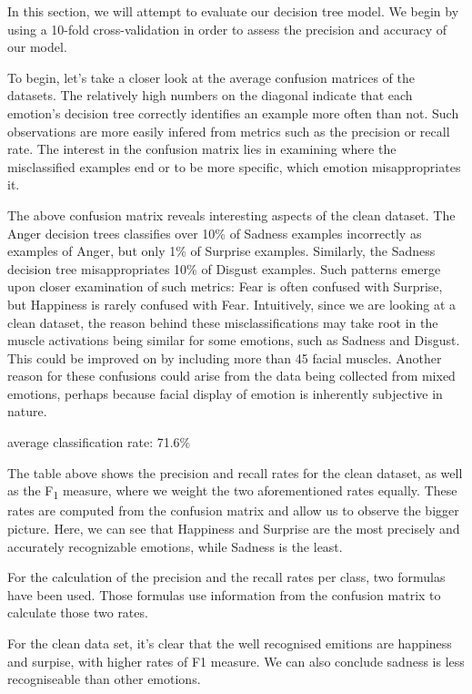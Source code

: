 In this section, we will attempt to evaluate our decision tree model. We begin by using a 10-fold cross-validation
in order to assess the precision and accuracy of our model. 

To begin, let's take a closer look at the average confusion matrices of the datasets.
The relatively high numbers on the diagonal indicate that each emotion's decision tree correctly
identifies an example more often than not. Such observations are more easily infered from metrics such as the precision or recall rate.
The interest in the confusion matrix lies in examining where the misclassified examples end or to be more specific,
which emotion misappropriates it. 



The above confusion matrix reveals interesting aspects of the clean dataset.
The Anger decision trees classifies over 10\% of Sadness examples incorrectly as examples of Anger, but only 1\% of Surprise examples.
Similarly, the Sadness decision tree misappropriates 10\% of Disgust examples.
Such patterns emerge upon closer examination of such metrics: Fear is often confused with Surprise, but Happiness is rarely confused with Fear.
Intuitively, since we are looking at a clean dataset,
the reason behind these misclassifications may take root in the muscle activations being similar for some emotions, such as Sadness and Disgust.
This could be improved on by including  more than 45 facial muscles.
Another reason for these confusions could arise from the data being collected from mixed emotions, perhaps because facial display
of emotion is inherently subjective in nature.



average classification rate: 71.6\%

The table above shows the precision and recall rates for the clean dataset, as well as the F\textsubscript{1} measure,
where we weight the two aforementioned rates equally. These rates are computed from the confusion matrix and allow us to
observe the bigger picture. Here, we can see that Happiness and Surprise are the most precisely and accurately recognizable
emotions, while Sadness is the least.

For the calculation of the precision and the recall rates per class, two formulas have been used.
Those formulas use information from the confusion matrix to calculate those two rates.

For the clean data set, it's clear that the well recognised emitions are happiness and surpise, with higher rates of F1 measure. 
We can also conclude sadness is less recogniseable than other emotions.



